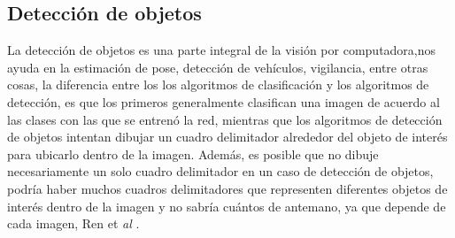 \begin{table}[H]
    \centering
    \caption{Matriz de confusión con otras métricas de evaluación}
    \label{tab:Matriz de confusion con otras metricas de evaluacion}
\end{table}


\subsection{Detección de objetos}\label{sec:deteccionobjetos}
La detección de objetos es una parte integral de la visión por computadora,nos ayuda en la estimación de pose, detección de vehículos, vigilancia, entre otras cosas, la diferencia entre los  los algoritmos de clasificación y los algoritmos de detección, es que los primeros generalmente clasifican una imagen de acuerdo al las clases con las que se entrenó la red, mientras que los algoritmos de detección de objetos intentan dibujar un cuadro delimitador alrededor del objeto de interés para ubicarlo dentro de la imagen. Además, es posible que no dibuje necesariamente un solo cuadro delimitador en un caso de detección de objetos, podría haber muchos cuadros delimitadores que representen diferentes objetos de interés dentro de la imagen y no sabría cuántos de antemano, ya que depende de cada imagen, Ren et \textit{al} \cite{DBLP:journals/corr/RenHG015}.


